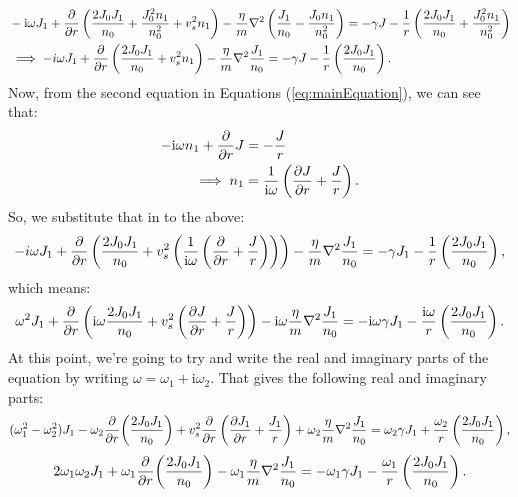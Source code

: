 \documentclass[12pt]{article}
\begin{document}
	\begin{align*}
	&-\mathrm{i}\omega J_1 + \pdv{r} \left( \frac{2 J_0 J_1}{n_0} +\frac{ J_0^2n_1}{n_0^2} + v_s^2 n_1 \right) - \frac{\eta}{m} \laplacian\left(\frac{J_1}{n_0} - \frac{J_0n_1}{n_0^2} \right) = -\gamma J - \frac{1}{r} \left( \frac{2 J_0 J_1}{n_0} +\frac{ J_0^2n_1}{n_0^2}\right) \\
	&\implies -i\omega J_1 + \pdv{r}\left(\frac{2J_0J_1}{n_0} + v_s^2n_1\right) - \frac{\eta}{m}\laplacian\frac{J_1}{n_0} = -\gamma J - \frac{1}{r}\left(\frac{2J_0J_1}{n_0} \right). \\
	\end{align*}
	Now, from the second equation in Equations (\ref{eq:mainEquation}), we can see that:
	\begin{align*}
	-\mathrm{i} \omega n_1 + \pdv{r}J &= -\frac{J}{r} \\
	\implies n_1 &= \frac{1}{\mathrm{i}\omega} \left( \pdv{J}{r} + \frac{J}{r} \right).
	\end{align*}
	So, we substitute that in to the above:
	\[-i\omega J_1 + \pdv{r}\left(\frac{2J_0J_1}{n_0} +v_s^2\left(\frac{1}{\mathrm{i}\omega} \left( \pdv{r} + \frac{J}{r} \right) \right) \right) - \frac{\eta}{m}\laplacian\frac{J_1}{n_0} = -\gamma J_1 - \frac{1}{r}\left(\frac{2J_0J_1}{n_0} \right), \]
	which means: 
	\[\omega^2 J_1 +  \pdv{r}\left(\mathrm{i}\omega\frac{2J_0J_1}{n_0} +  v_s^2\left(\pdv{J}{r}+\frac{J}{r}\right) \right) - \mathrm{i}\omega\frac{\eta}{m} \laplacian\frac{J_1}{n_0} = - \mathrm{i}\omega \gamma J_1 - \frac{\mathrm{i}\omega}{r} \left( \frac{2J_0J_1}{n_0}\right). \]
	At this point, we're going to try and write the real and imaginary parts of the equation by writing $\omega = \omega_1 + \mathrm{i}\omega_2$.  That gives the following real and imaginary parts:
	\begin{equation}
	\label{eq:realPart}
	(\omega_1^2 - \omega_2^2)J_1-\omega_2\pdv{r}(\frac{2J_0J_1}{n_0}) + v_s^2 \pdv{r}\left( \pdv{J_1}{r} + \frac{J_1}{r}\right) + \omega_2\frac{\eta}{m}\laplacian\frac{J_1}{n_0} = \omega_2\gamma J_1 + \frac{\omega_2}{r}\left(\frac{2J_0J_1}{n_0}\right),
	\end{equation}
	\begin{equation}
	\label{eq:imagPart}
	2\omega_1 \omega_2 J_1 + \omega_1\pdv{r}(\frac{2J_0J_1}{n_0}) - \omega_1\frac{\eta}{m}\laplacian\frac{J_1}{n_0} = -\omega_1 \gamma J_1 - \frac{\omega_1}{r}\left(\frac{2J_0J_1}{n_0}\right).
	\end{equation}
	
	
\end{document}
